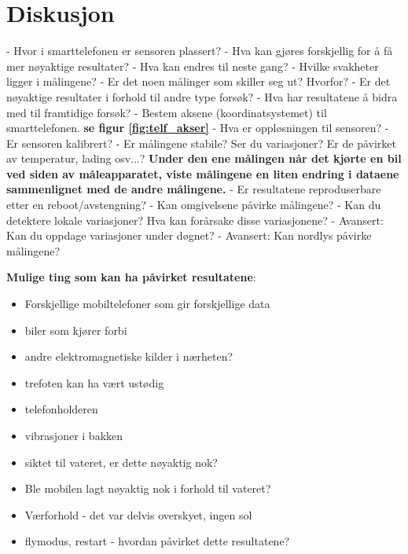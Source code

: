 \section{Diskusjon}

- Hvor i smarttelefonen er sensoren plassert? \newline 
- Hva kan gjøres forskjellig for å få mer nøyaktige resultater? - Hva kan endres til neste gang? \newline
- Hvilke svakheter ligger i målingene? \newline
- Er det noen målinger som skiller seg ut? Hvorfor? \newline
- Er det nøyaktige resultater i forhold til andre type forsøk? \newline 
- Hva har resultatene å bidra med til framtidige forsøk? \newline                                    
- Bestem aksene (koordinatsystemet) til smarttelefonen. \textbf{se figur \ref{fig:telf_akser} }\newline 
- Hva er oppløsningen til sensoren? \newline 
- Er sensoren kalibrert? \newline
- Er målingene stabile? Ser du variasjoner? Er de påvirket av temperatur, lading
osv...? \textbf{Under den ene målingen når det kjørte en bil ved siden av måleapparatet, viste målingene en liten endring i dataene sammenlignet med de andre målingene. }\newline
- Er resultatene reproduserbare etter en reboot/avstengning? \newline
- Kan omgivelsene påvirke målingene? \newline                      
- Kan du detektere lokale variasjoner? Hva kan forårsake disse variasjonene?  \newline
- Avansert: Kan du oppdage variasjoner under døgnet? \newline
- Avansert: Kan nordlys påvirke målingene? \newline 

\noindent\textbf{Mulige ting som kan ha påvirket resultatene}:
\begin{itemize}
    \item Forskjellige mobiltelefoner som gir forskjellige data 
    \item biler som kjører forbi
    \item andre elektromagnetiske kilder i nærheten? 
    \item trefoten kan ha vært ustødig
    \item telefonholderen
    \item vibrasjoner i bakken               
    \item siktet til vateret, er dette nøyaktig nok?
    \item Ble mobilen lagt nøyaktig nok i forhold til vateret?
    \item Værforhold - det var delvis overskyet, ingen sol
    \item flymodus, restart - hvordan påvirket dette resultatene?

\end{itemize}



